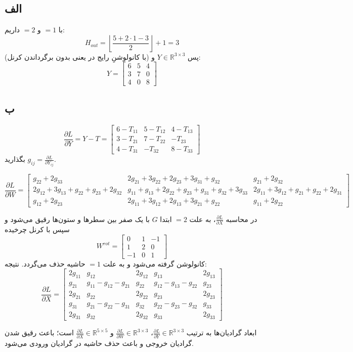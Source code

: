 \subsection*{الف}
با $=1$ و $=2$ داریم:
\[
H_{out} = \left\lfloor \frac{5+2\cdot 1-3}{2} \right\rfloor + 1 = 3
\]
پس $Y \in \mathbb{R}^{3\times 3}$ و (با کانولوشنِ رایج در  یعنی بدون برگرداندن کرنل):
\[
Y =
\begin{bmatrix}
6 & 5 & 4 \\
3 & 7 & 0 \\
4 & 0 & 8
\end{bmatrix}
\]

\subsection*{ب}
\[
\frac{\partial L}{\partial Y} = Y - T =
\begin{bmatrix}
6-T_{11} & 5-T_{12} & 4-T_{13} \\
3-T_{21} & 7-T_{22} & -T_{23} \\
4-T_{31} & -T_{32} & 8-T_{33}
\end{bmatrix}
\]
بگذارید $g_{ij} = \frac{\partial L}{\partial Y_{ij}}$.

\[
\frac{\partial L}{\partial W} =
\begin{bmatrix}
g_{22}+2g_{33} &
2g_{21}+3g_{22}+2g_{23}+3g_{31}+g_{32} &
g_{21}+2g_{32} \\
2g_{12}+3g_{13}+g_{22}+g_{23}+2g_{32} &
g_{11}+g_{13}+2g_{22}+g_{23}+g_{31}+g_{32}+3g_{33} &
2g_{11}+3g_{12}+g_{21}+g_{22}+2g_{31} \\
g_{12}+2g_{23} &
2g_{11}+3g_{12}+2g_{13}+3g_{21}+g_{22} &
g_{11}+2g_{22}
\end{bmatrix}
\]

در محاسبه $\frac{\partial L}{\partial X}$، به علت $=2$ ابتدا $G$ با یک صفر بین سطرها و ستون‌ها رقیق می‌شود و سپس با کرنل چرخیده
\[
W^{rot} =
\begin{bmatrix}
0 & 1 & -1 \\
1 & 2 & 0 \\
-1 & 0 & 1
\end{bmatrix}
\]
کانولوشن  گرفته می‌شود و به علت $=1$ حاشیه حذف می‌گردد. نتیجه:
\[
\frac{\partial L}{\partial X} =
\begin{bmatrix}
2g_{11} & g_{12} & 2g_{12} & g_{13} & 2g_{13} \\
g_{21} & g_{11}-g_{12}-g_{21} & g_{22} & g_{12}-g_{13}-g_{22} & g_{23} \\
2g_{21} & g_{22} & 2g_{22} & g_{23} & 2g_{23} \\
g_{31} & g_{21}-g_{22}-g_{31} & g_{32} & g_{22}-g_{23}-g_{32} & g_{33} \\
2g_{31} & g_{32} & 2g_{32} & g_{33} & 2g_{33}
\end{bmatrix}
\]

ابعاد گرادیان‌ها به ترتیب $\frac{\partial L}{\partial Y}\in\mathbb{R}^{3\times 3}$، $\frac{\partial L}{\partial W}\in\mathbb{R}^{3\times 3}$ و $\frac{\partial L}{\partial X}\in\mathbb{R}^{5\times 5}$ است؛  باعث رقیق شدن گرادیان خروجی و  باعث حذف حاشیه در گرادیان ورودی می‌شود.